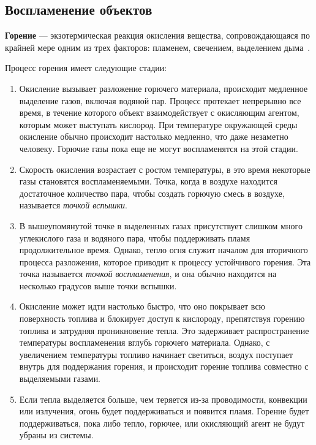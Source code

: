 \subsection{Воспламенение объектов}

\textbf{Горение} --- экзотермическая реакция окисления вещества,
сопровождающаяся по крайней мере одним из трех факторов: пламенем, свечением,
выделением дыма~\cite{383-87}.

Процесс горения имеет следующие стадии:
\begin{enumerate}
    \item Окисление вызывает разложение горючего материала, происходит\break{}
        медленное выделение газов, включая водяной пар.  Процесс протекает
        непрерывно все время, в течение которого объект взаимодействует с
        окисляющим агентом, которым может выступать кислород. При температуре
        окружающей среды окисление обычно происходит настолько медленно, что
        даже незаметно человеку. Горючие газы пока еще не могут воспламенятся на
        этой стадии.

    \item Скорость окисления возрастает с ростом температуры, в это время
        некоторые газы становятся воспламеняемыми. Точка, когда в воздухе
        находится достаточное количество пара, чтобы создать горючую смесь в
        воздухе, называется \emph{точкой вспышки}.

    \item В вышеупомянутой точке в выделенных газах присутствует слишком много
        углекислого газа и водяного пара, чтобы поддерживать пламя
        продолжительное время. Однако, тепло огня служит началом для вторичного
        процесса разложения, которое приводит к процессу устойчивого горения.
        Эта точка называется \emph{точкой воспламенения}, и она обычно находится
        на несколько градусов выше точки вспышки.

    \item Окисление может идти настолько быстро, что оно покрывает всю
        поверхность топлива и блокирует доступ к кислороду, препятствуя горению
        топлива и затрудняя проникновение тепла. Это задерживает распространение
        температуры воспламенения вглубь горючего материала. Однако, с
        увеличением температуры топливо начинает светиться, воздух поступает
        внутрь для поддержания горения, и происходит горение топлива совместно с
        выделяемыми газами.

    \item Если тепла выделяется больше, чем теряется из-за проводимости,
        конвекции или излучения, огонь будет поддерживаться и появится пламя.
        Горение будет поддерживаться, пока либо тепло, горючее, или окисляющий
        агент не будут убраны из системы.
\end{enumerate}

